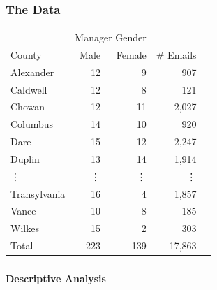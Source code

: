 \documentclass[xcolor={table}]{beamer}
\newenvironment{changemargin}[2]{%
  \begin{list}{}{%
    \setlength{\topsep}{0pt}%
    \setlength{\leftmargin}{#1}%
    \setlength{\rightmargin}{#2}%
    \setlength{\listparindent}{\parindent}%
    \setlength{\itemindent}{\parindent}%
    \setlength{\parsep}{\parskip}%
  }%
  \item[]}{\end{list}}
\begin{document}
\begin{frame}\frametitle{The Data}
	\Large
\begin{changemargin}{-1cm}{ -1cm}	
	  \centering
	  \vspace*{-.3in}
	  \centering
	  \begin{tabular}{lrrrr}
	    \toprule
	    & \multicolumn{2}{c}{Manager Gender} & \\
	    \cmidrule{2-3}
	    County & Male & Female & \# Emails  \\
	    \midrule
	    Alexander & 12 & 9 & 907   \\
	    Caldwell & 12 & 8 & 121     \\
	    Chowan & 12 & 11 & 2,027   \\
	    Columbus & 14 & 10 & 920   \\
	    Dare & 15 & 12 & 2,247    \\
	    Duplin & 13 & 14 & 1,914    \\
		\vdots & \vdots & \vdots & \vdots \\
	    Transylvania & 16 & 4 & 1,857  \\
	    Vance & 10 & 8 & 185   \\
	    Wilkes & 15 & 2 & 303   \\
	    \midrule
	    Total & 223 & 139 & 17,863 \\
	    \bottomrule
	  \end{tabular}

\end{changemargin}

\end{frame}

\begin{frame}\frametitle{}
	\begin{center}
		\Huge\textbf{Descriptive Analysis}
	\end{center}
\end{frame}
\end{document}
